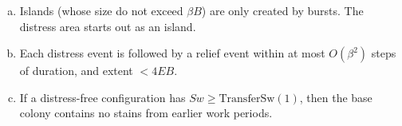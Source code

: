 \documentclass[12pt]{memoir}
\newcommand{\fld}[1]{\ensuremath{\textit{#1}}}
\def\B{B}
\newcommand{\E}{E}
\newcommand{\Noise}{\mathit{Noise}}
\newcommand{\Sweep}{\fld{Sw}}
\newcommand{\TransferSw}{\mathrm{TransferSw}}
\newcommand{\mrk}{\mathrm{mrk}}
\newcommand{\loc}{\ell_\mrk}
\begin{document}
\begin{definition}
    \begin{enumerate}[(a)]

        \item \label{i:annotated-hist.progress}
            Islands (whose size do not exceed \( \beta\B \))
            are only created
            by bursts.
            The distress area starts out as an island.




        \item\label{i:annotated-hist.distress}
            Each distress event is followed by a relief event within at most \( O(\beta^{2}) \) %
            steps of duration, and extent \( <4\E\B \).

        \item\label{i:annotated-hist.stain}
            If a distress-free configuration has
            \( \Sweep \ge \TransferSw(1) \),
            then the base colony contains no stains
            from earlier work periods.
        \end{enumerate}
\end{definition}




%
%
\end{document}
